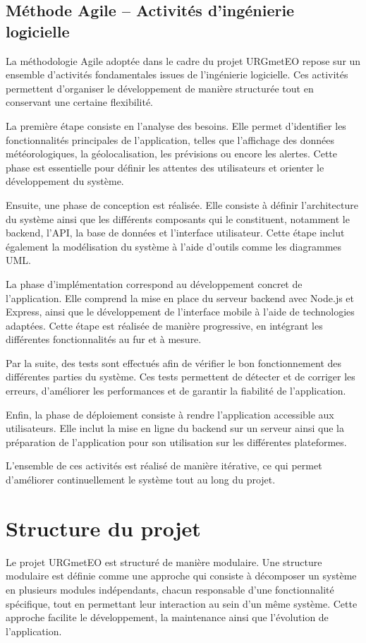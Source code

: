 \subsection{Méthode Agile – Activités d’ingénierie logicielle}

La méthodologie Agile adoptée dans le cadre du projet URGmetEO repose sur un ensemble d’activités fondamentales issues de l’ingénierie logicielle. Ces activités permettent d’organiser le développement de manière structurée tout en conservant une certaine flexibilité.

\noindent La première étape consiste en l’analyse des besoins. Elle permet d’identifier les fonctionnalités principales de l’application, telles que l’affichage des données météorologiques, la géolocalisation, les prévisions ou encore les alertes. Cette phase est essentielle pour définir les attentes des utilisateurs et orienter le développement du système.

\noindent Ensuite, une phase de conception est réalisée. Elle consiste à définir l’architecture du système ainsi que les différents composants qui le constituent, notamment le backend, l’API, la base de données et l’interface utilisateur. Cette étape inclut également la modélisation du système à l’aide d’outils comme les diagrammes UML.

\noindent La phase d’implémentation correspond au développement concret de l’application. Elle comprend la mise en place du serveur backend avec Node.js et Express, ainsi que le développement de l’interface mobile à l’aide de technologies adaptées. Cette étape est réalisée de manière progressive, en intégrant les différentes fonctionnalités au fur et à mesure.

\noindent Par la suite, des tests sont effectués afin de vérifier le bon fonctionnement des différentes parties du système. Ces tests permettent de détecter et de corriger les erreurs, d’améliorer les performances et de garantir la fiabilité de l’application.

\noindent Enfin, la phase de déploiement consiste à rendre l’application accessible aux utilisateurs. Elle inclut la mise en ligne du backend sur un serveur ainsi que la préparation de l’application pour son utilisation sur les différentes plateformes.

\noindent L’ensemble de ces activités est réalisé de manière itérative, ce qui permet d’améliorer continuellement le système tout au long du projet.


\section{Structure du projet}
Le projet URGmetEO est structuré de manière modulaire. Une structure modulaire est définie comme une approche qui consiste à décomposer un système en plusieurs modules indépendants, chacun responsable d’une fonctionnalité spécifique, tout en permettant leur interaction au sein d’un même système. Cette approche facilite le développement, la maintenance ainsi que l’évolution de l’application.

